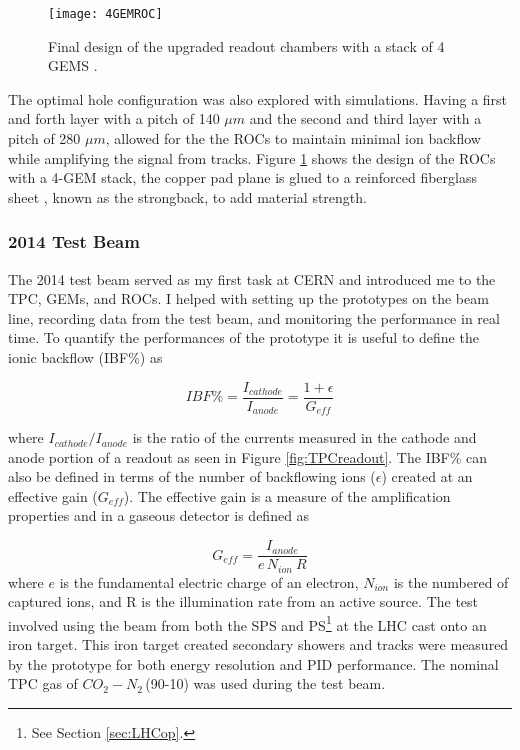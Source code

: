\begin{figure}[h]
\texttt{[image: 4GEMROC]}
\centering
\caption{Final design of the upgraded readout chambers with a stack of 4 GEMS \cite{CERN-LHCC-2013-020}. }
\label{fig:4GEM}
\end{figure}

The optimal hole configuration was also explored with simulations.  Having a first and forth layer with a pitch of 140 $\mu m$ and the second and third layer with a pitch of 280 $\mu m$, allowed for the the ROCs to maintain minimal ion backflow while amplifying the signal from tracks.  Figure \ref{fig:4GEM} shows the design of the ROCs with a 4-GEM stack, the copper pad plane is glued to a reinforced fiberglass sheet , known as the strongback, to add material strength.

\subsubsection{2014 Test Beam}

The 2014 test beam served as my first task at CERN and introduced me to the TPC, GEMs, and ROCs.  I helped with setting up the prototypes on the beam line, recording data from the test beam, and monitoring the performance in real time.  To quantify the performances of the prototype it is useful to define the ionic backflow (IBF\%) as

\begin{equation}
IBF \% = \frac{ I_{cathode} }{ I_{anode} } = \frac{1 + \epsilon }{ G_{eff} }
\label{eq:IBF}
\end{equation}

\noindent
where $ I_{cathode} / I_{anode}$ is the ratio of the currents measured in the cathode and anode portion of a readout as seen in Figure \ref{fig:TPCreadout}.  The IBF\% can also be defined in terms of the number of backflowing ions ($\epsilon$) created at an effective gain ($G_{eff}$).  The effective gain is a measure of the amplification properties and in a gaseous detector is defined as

\begin{equation}
G_{eff}=\frac{I_{anode}}{\textit{e} \,  N_{ion} \ R}
\label{eq:gain}
\end{equation}
\noindent
where $\textit{e}$ is the fundamental electric charge of an electron, $N_{ion}$ is the numbered of captured ions, and R is the illumination rate from an active source.  The test involved using the beam from both the SPS and PS\footnote{See Section \ref{sec:LHCop}.} at the LHC cast onto an iron target.  This iron target created secondary showers and tracks were measured by the prototype for both energy resolution and PID performance.  The nominal TPC gas of $CO_{2}-N_{2}\,$(90-10) was used during the test beam.  

